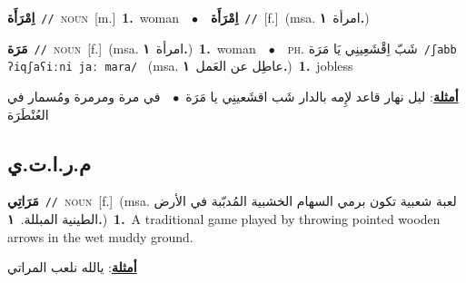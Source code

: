 \documentclass[10pt,a4paper,twoside]{article} %
\begin{document}
\begin{multicols}{2}
{\setlength\topsep{0pt}\textbf{\foreignlanguage{arabic}{اِمْرَأَة}}\ {\color{gray}\texttt{//}\color{black}}\ \textsc{noun}\ [m.]\ \textbf{1.}~woman\ \ $\bullet$\ \ \setlength\topsep{0pt}\textbf{\foreignlanguage{arabic}{اِمْرَأَة}}\ {\color{gray}\texttt{//}\color{black}}\ [f.]\ \color{gray}(msa. \foreignlanguage{arabic}{امرأة}~\foreignlanguage{arabic}{\textbf{١.}})\color{black}\ } \vspace{2mm}

{\setlength\topsep{0pt}\textbf{\foreignlanguage{arabic}{مَرَة}}\ {\color{gray}\texttt{//}\color{black}}\ \textsc{noun}\ [f.]\ \color{gray}(msa. \foreignlanguage{arabic}{امرأة}~\foreignlanguage{arabic}{\textbf{١.}})\color{black}\ \textbf{1.}~woman\ \ $\bullet$\ \ \textsc{ph.} \color{gray} \foreignlanguage{arabic}{شَبّ اِقْشَعِينِي يَا مَرَة}\color{black}\ {\color{gray}\texttt{/{\sffamily ʃabb ʔiqʃaʕiːni jaː mara}/}\color{black}}\ \color{gray} (msa. \foreignlanguage{arabic}{عاطِل عن العَمل}~\foreignlanguage{arabic}{\textbf{١.}})\color{black}\ \textbf{1.}~jobless\  \begin{flushright}\color{gray}\foreignlanguage{arabic}{\textbf{\underline{\foreignlanguage{arabic}{أمثلة}}}: ليل نهار قاعد لإِمه بالدار شَب اقشَعينِي يا مَرَة\ $\bullet$\ \  في مرة ومرمرة ومُسمار في العُنْطَرَة}\end{flushright}\color{black}} \vspace{2mm}

\vspace{-3mm}
\subsection*{\color{blue}\foreignlanguage{arabic}{م.ر.ا.ت.ي}\color{blue}{ (ntws)}} 

{\setlength\topsep{0pt}\textbf{\foreignlanguage{arabic}{مَرَاتِي}}\ {\color{gray}\texttt{//}\color{black}}\ \textsc{noun}\ [f.]\ \color{gray}(msa. \foreignlanguage{arabic}{لعبة شعبية تكون برمي السهام الخشبية المُدبّبة في الأرض الطينية المبللة.}~\foreignlanguage{arabic}{\textbf{١.}})\color{black}\ \textbf{1.}~A traditional game played by throwing pointed wooden arrows in the wet muddy ground.\  \begin{flushright}\color{gray}\foreignlanguage{arabic}{\textbf{\underline{\foreignlanguage{arabic}{أمثلة}}}: يالله نلعب المراتي}\end{flushright}\color{black}} \vspace{2mm}


\end{multicols}
\end{document}
